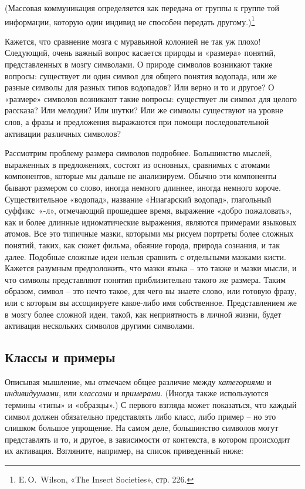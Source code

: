 \documentclass[../main.tex]{subfiles}
\begin{document}
(Массовая коммуникация определяется как передача от группы к группе той информации, которую один индивид не способен передать другому.)\footnote{E.\,O.~Wilson, «The Insect Societies», стр. 226.}

Кажется, что сравнение мозга с муравьиной колонией не так уж плохо! Следующий, очень важный вопрос касается природы и «размера» понятий, представленных в мозгу символами. О природе символов возникают такие вопросы: существует ли один символ для общего понятия водопада, или же разные символы для разных типов водопадов? Или верно и то и другое? О «размере» символов возникают такие вопросы: существует ли символ для целого рассказа? Или мелодии? Или шутки? Или же символы существуют на уровне слов, а фразы и предложения выражаются при помощи последовательной активации различных символов?

Рассмотрим проблему размера символов подробнее. Большинство мыслей, выраженных в предложениях, состоят из основных, сравнимых с атомами компонентов, которые мы дальше не анализируем. Обычно эти компоненты бывают размером со слово, иногда немного длиннее, иногда немного короче. Существительное «водопад», название «Ниагарский водопад», глагольный суффикс~«-л», отмечающий прошедшее время, выражение «добро пожаловать», как и более длинные идиоматические выражения, являются примерами языковых атомов. Все это типичные мазки, которыми мы рисуем портреты более сложных понятий, таких, как сюжет фильма, обаяние города, природа сознания, и так далее. Подобные сложные идеи нельзя сравнить с отдельными мазками кисти. Кажется разумным предположить, что мазки языка \--- это также и мазки мысли, и что символы представляют понятия приблизительно такого же размера. Таким образом, символ \--- это нечто такое, для чего вы знаете слово, или готовую фразу, или с которым вы ассоциируете какое-либо имя собственное. Представлением же в мозгу более сложной идеи, такой, как неприятность в личной жизни, будет активация нескольких символов другими символами.


\subsection{Классы и примеры}

Описывая мышление, мы отмечаем общее различие между \emph{категориями} и \emph{индивидуумами}, или \emph{классами} и \emph{примерами}. (Иногда также используются термины «типы» и «образцы».) С первого взгляда может показаться, что каждый символ должен обязательно представлять либо класс, либо пример \--- но это слишком большое упрощение. На самом деле, большинство символов могут представлять и то, и другое, в зависимости от контекста, в котором происходит их активация. Взгляните, например, на список приведенный ниже:
\end{document}
